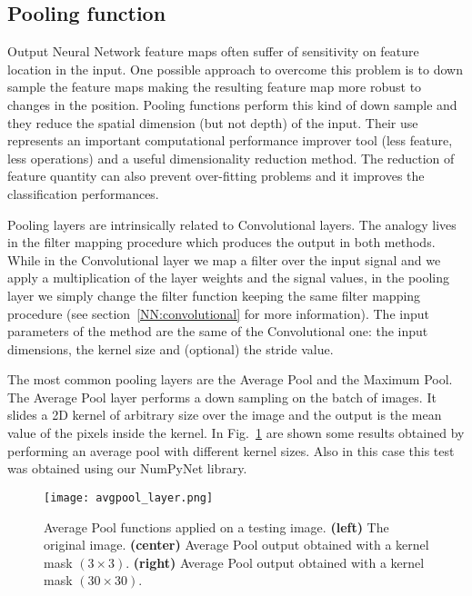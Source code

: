 \documentclass{standalone}
\begin{document}
\subsection[Pooling function]{Pooling function}\label{NN:pooling}

Output Neural Network feature maps often suffer of sensitivity on feature location in the input.
One possible approach to overcome this problem is to down sample the feature maps making the resulting feature map more robust to changes in the position.
Pooling functions perform this kind of down sample and they reduce the spatial dimension (but not depth) of the input.
Their use represents an important computational performance improver tool (less feature, less operations) and a useful dimensionality reduction method.
The reduction of feature quantity can also prevent over-fitting problems and it improves the classification performances.

Pooling layers are intrinsically related to Convolutional layers.
The analogy lives in the filter mapping procedure which produces the output in both methods.
While in the Convolutional layer we map a filter over the input signal and we apply a multiplication of the layer weights and the signal values, in the pooling layer we simply change the filter function keeping the same filter mapping procedure (see section~\ref{NN:convolutional} for more information).
The input parameters of the method are the same of the Convolutional one: the input dimensions, the kernel size and (optional) the stride value.

The most common pooling layers are the Average Pool and the Maximum Pool.
The Average Pool layer performs a down sampling on the batch of images.
It slides a 2D kernel of arbitrary size over the image and the output is the mean value of the pixels inside the kernel.
In Fig.~\ref{fig:avgpool} are shown some results obtained by performing an average pool with different kernel sizes.
Also in this case this test was obtained using our \textsf{NumPyNet} library.

\begin{center}
\begin{figure}[htbp]
\centering
\texttt{[image: avgpool\_layer.png]}
\caption{Average Pool functions applied on a testing image.
\textbf{(left)} The original image.
\textbf{(center)} Average Pool output obtained with a kernel mask $(3\times 3)$.
\textbf{(right)} Average Pool output obtained with a kernel mask $(30\times 30)$.
}
\label{fig:avgpool}
\end{figure}
\end{center}
\end{document}
